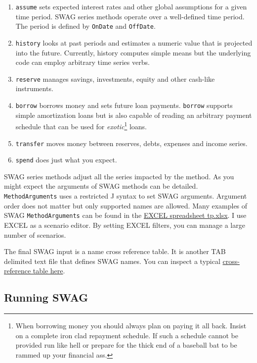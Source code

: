 \begin{enumerate}
\def\labelenumi{\arabic{enumi}.}
\item
  \texttt{assume} sets expected interest rates and other global
  assumptions for a given time period. SWAG series methods operate over
  a well-defined time period. The period is defined by \texttt{OnDate}
  and \texttt{OffDate}.
\item
  \texttt{history} looks at past periods and estimates a numeric value
  that is projected into the future. Currently, history computes simple
  means but the underlying code can employ arbitrary time series verbs.
\item
  \texttt{reserve} manages savings, investments, equity and other
  cash-like instruments.
\item
  \texttt{borrow} borrows money and sets future loan payments. \texttt{borrow}
  supports simple amortization loans but is also capable of reading an
  arbitrary payment schedule that can be used for
  \emph{exotic}\footnote{When borrowing money you should always plan on
    paying it all back. Insist on a complete iron clad repayment
    schedule. If such a schedule cannot be provided run like hell or
    prepare for the thick end of a baseball bat to be rammed up your
    financial ass.} loans.
\item
  \texttt{transfer} moves money between reserves, debts, expenses and
  income series.
\item
  \texttt{spend} does just what you expect.
\end{enumerate}

SWAG series methods adjust all the series impacted by the method. As you
might expect the arguments of SWAG methods can be detailed.
\texttt{MethodArguments} uses a restricted J syntax to set SWAG
arguments. Argument order does not matter but only supported names are
allowed. Many examples of SWAG \texttt{MethodArguments} can be found in
the
\href{https://github.com/bakerjd99/jacks/blob/master/swag/tests/tp.xlsx}{EXCEL
spreadsheet tp.xlsx}. I use EXCEL as a scenario editor. By setting EXCEL
filters, you can manage a large number of scenarios.

The final SWAG input is a name cross reference table. It is another TAB
delimited text file that defines SWAG names. You can inspect a typical
\href{https://github.com/bakerjd99/jacks/blob/master/swag/tests/CrossReference.txt}{cross-reference
table here}.

\subsection*{Running SWAG}%

